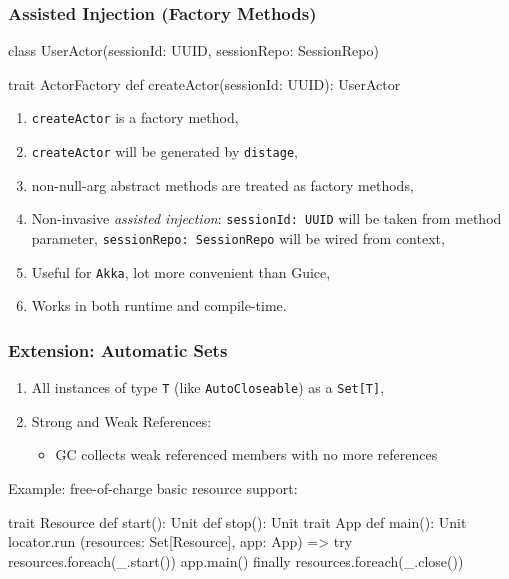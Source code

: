\documentclass[usenames,dvipsnames]{beamer}
\newcommand{\distage}{\texttt{distage}\xspace}
\begin{document}
\begin{frame}[fragile]
  \frametitle{Assisted Injection (Factory Methods)}
  \begin{scalacode}
class UserActor(sessionId: UUID, sessionRepo: SessionRepo)

trait ActorFactory {
  def createActor(sessionId: UUID): UserActor
}
  \end{scalacode}

  \begin{enumerate}
    \item \texttt{createActor} is a factory method,
    \item \texttt{createActor} will be generated by \distage,
    \item non-null-arg abstract methods are treated as factory methods,
    \item Non-invasive \textit{assisted injection}: \texttt{sessionId: UUID} will be taken from method parameter, \texttt{sessionRepo: SessionRepo} will be wired from context,
    \item Useful for \texttt{Akka}, lot more convenient than Guice,
    \item Works in both runtime and compile-time.
  \end{enumerate}
\end{frame}

\begin{frame}[fragile]
  \frametitle{Extension: Automatic Sets}

  \begin{enumerate}
    \item All instances of type \texttt{T} (like \texttt{AutoCloseable}) as a \texttt{Set[T]},
    \item Strong and Weak References:
      \begin{itemize}
        \item GC collects weak referenced members with no more references
      \end{itemize}
  \end{enumerate}

  Example: free-of-charge basic resource support:

  \begin{scalacode}
trait Resource {
  def start(): Unit
  def stop(): Unit
}
trait App { def main(): Unit }
locator.run { (resources: Set[Resource], app: App) =>
  try {
    resources.foreach(_.start())
    app.main()
  } finally { resources.foreach(_.close()) }
}
  \end{scalacode}
\end{frame}
\end{document}
